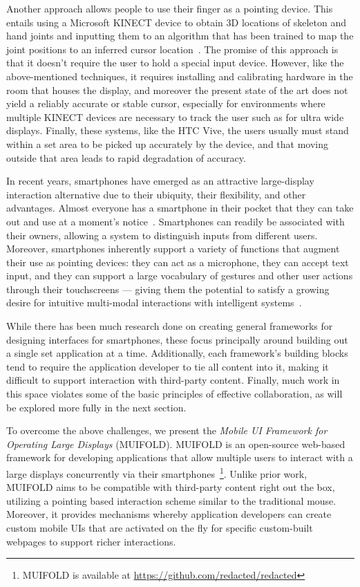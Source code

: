 Another approach allows people to use their finger as a pointing device. This entails using a Microsoft KINECT device to obtain 3D locations of skeleton and hand joints and inputting them to an algorithm that has been trained to map the joint positions to an inferred cursor location~\cite{biswas_gesture_2011,ren_robust_2013,zhao_immersive_2018}. The promise of this approach is that it doesn't require the user to hold a special input device. However, like the above-mentioned techniques, it requires installing and calibrating hardware in the room that houses the display, and moreover the present state of the art does not yield a reliably accurate or stable cursor, especially for environments where multiple KINECT devices are necessary to track the user such as for ultra wide displays. Finally, these systems, like the HTC Vive, the users usually must stand within a set area to be picked up accurately by the device, and that moving outside that area leads to rapid degradation of accuracy.

In recent years, smartphones have emerged as an attractive large-display interaction alternative due to their ubiquity, their flexibility, and other advantages. Almost everyone has a smartphone in their pocket that they can take out and use at a moment's notice~\cite{di_geronimo_surveying_2016}. Smartphones can readily be associated with their owners, allowing a system to distinguish inputs from different users. Moreover, smartphones inherently support a variety of functions that augment their use as pointing devices: they can act as a microphone, they can accept text input, and they can support a large vocabulary of gestures and other user actions through their touchscreens --- giving them the potential to satisfy a growing desire for intuitive multi-modal interactions with intelligent systems~\cite{davies_pervasive_2014,kephart_embodied_2019}.

While there has been much research done on creating
general frameworks for designing interfaces for smartphones,
these focus principally around building out a single set application at a time. Additionally, each framework's building blocks tend to require the
application developer to tie all content into it, making it difficult to support interaction with  
third-party content. Finally, much work in this space violates some of the basic principles of effective collaboration, as will be explored more fully in the next section.

To overcome the above challenges, we present the \textit{Mobile UI 
Framework for Operating Large Displays} (MUIFOLD). MUIFOLD is an
open-source web-based framework for developing applications that allow multiple users to interact with a large displays concurrently via their smartphones~\footnote{MUIFOLD is available at 
\url{https://github.com/redacted/redacted}}. Unlike prior work,
MUIFOLD aims to be compatible with third-party content right out
the box, utilizing a pointing based interaction scheme similar to
the traditional mouse. Moreover, it provides mechanisms whereby
application developers can create custom mobile UIs that are 
activated on the fly for specific custom-built webpages to support richer interactions.